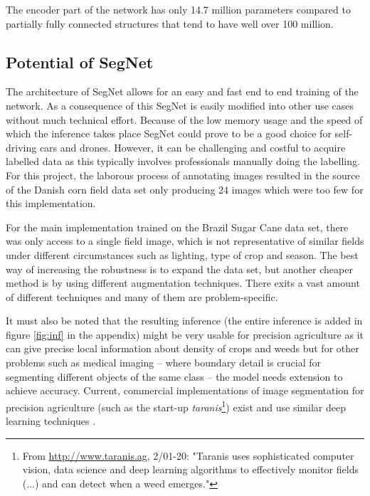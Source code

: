 \documentclass{article}
\begin{document}
The encoder part of the network has only 14.7 million parameters compared to partially fully connected structures that tend to have well over 100 million. \cite{seg}


\subsection{Potential of SegNet}
The architecture of SegNet allows for an easy and fast end to end training of the network. As a consequence of this SegNet is easily modified into other use cases without much technical effort. Because of the low memory usage and the speed of which the inference takes place SegNet could prove to be a good choice for self-driving cars and drones. However, it can be challenging and costful to acquire labelled data as this typically involves professionals manually doing the labelling. For this project, the laborous process of annotating images resulted in the source of the Danish corn field data set only producing 24 images which were too few for this implementation.

For the main implementation trained on the Brazil Sugar Cane data set, there was only access to a single field image, which is not representative of similar fields under different circumstances such as lighting, type of crop and season. The best way of increasing the robustness is to expand the data set, but another cheaper method is by using different augmentation techniques. There exits a vast amount of different techniques and many of them are problem-specific. 

It must also be noted that the resulting inference (the entire inference is added in figure \ref{fig:inf} in the appendix) might be very usable for precision agriculture as it can give precise local information about density of crops and weeds but for other problems such as medical imaging -- where boundary detail is crucial for segmenting different objects of the same class -- the model needs extension to achieve accuracy.  Current, commercial implementations of image segmentation for precision agriculture (such as the start-up \textit{taranis}\footnote{From \url{http://www.taranis.ag}, 2/01-20: "Taranis uses sophisticated computer vision, data science and deep learning algorithms to effectively monitor fields (...) and can detect when a weed emerges."  }) exist and use similar deep learning techniques \cite{brazil}.
\vspace*{-.5cm}
\end{document}
